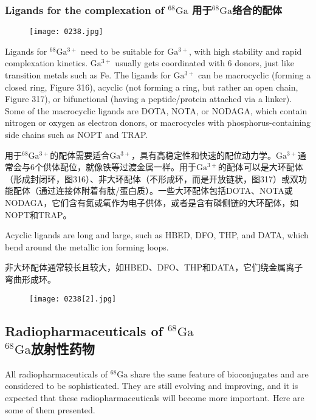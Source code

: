 \documentclass[dvipsnames, svgnames,a4paper,11pt]{article}
\begin{document}
\subsubsection{Ligands for the complexation of \(\mathrm{^{68}Ga}\) 用于\(\mathrm{^{68}Ga}\)络合的配体}  

\begin{figure}[h]
	\centering
    \texttt{[image: 0238.jpg]}  
     \label{fig316}
\end{figure}

Ligands for \(\mathrm{^{68}Ga^{3+}}\) need to be suitable for \(\mathrm{Ga^{3+}}\), with high stability and rapid complexation kinetics. \(\mathrm{Ga^{3+}}\) usually gets coordinated with 6 donors, just like transition metals such as Fe. The ligands for \(\mathrm{Ga^{3+}}\) can be macrocyclic (forming a closed ring, Figure 316), acyclic (not forming a ring, but rather an open chain, Figure 317), or bifunctional (having a peptide/protein attached via a linker). Some of the macrocyclic ligands are DOTA, NOTA, or NODAGA, which contain nitrogen or oxygen as electron donors, or macrocycles with phosphorus-containing side chains such as NOPT and TRAP.

用于\(\mathrm{^{68}Ga^{3+}}\)的配体需要适合\(\mathrm{Ga^{3+}}\)，具有高稳定性和快速的配位动力学。\(\mathrm{Ga^{3+}}\)通常会与6个供体配位，就像铁等过渡金属一样。用于\(\mathrm{Ga^{3+}}\)的配体可以是大环配体（形成封闭环，图316）、非大环配体（不形成环，而是开放链状，图317）或双功能配体（通过连接体附着有肽/蛋白质）。一些大环配体包括DOTA、NOTA或NODAGA，它们含有氮或氧作为电子供体，或者是含有磷侧链的大环配体，如NOPT和TRAP。

Acyclic ligands are long and large, such as HBED, DFO, THP, and DATA, which bend around the metallic ion forming loops.

非大环配体通常较长且较大，如HBED、DFO、THP和DATA，它们绕金属离子弯曲形成环。

\begin{figure}[h]
	\centering
    \texttt{[image: 0238[2].jpg]}  
     \label{fig317}
\end{figure}

\subsection{Radiopharmaceuticals of \(\mathrm{^{68}Ga}\)\\ \(\mathrm{^{68}Ga}\)放射性药物}  
All radiopharmaceuticals of \(\mathrm{^{68}Ga}\) share the same feature of bioconjugates and are considered to be sophisticated. They are still evolving and improving, and it is expected that these radiopharmaceuticals will become more important. Here are some of them presented.
\end{document}
